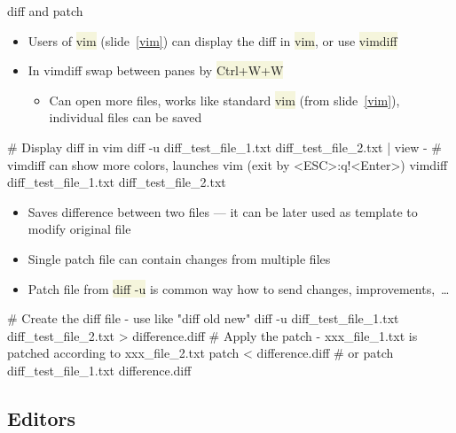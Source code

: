 \documentclass[compress, xelatex, 11pt, xcolor=svgnames, aspectratio=169, url={hyphens, lowtilde}]{beamer}
\renewcommand{\texttt}[1]{\colorbox{Beige}{{\ttfamily #1}}}
\begin{document}
\begin{frame}[fragile]{diff and patch}
	\begin{itemize}
		\item Users of \texttt{vim} (slide~\ref{vim}) can display the diff in \texttt{vim}, or use \texttt{vimdiff}
		\item In vimdiff swap between panes by \texttt{Ctrl+W+W}
		\begin{itemize}
			\item Can open more files, works like standard \texttt{vim} (from slide~\ref{vim}), individual files can be saved
		\end{itemize}
	\end{itemize}
	\vfill
	\begin{bashcode}
    # Display diff in vim
    diff -u diff_test_file_1.txt diff_test_file_2.txt | view -
    # vimdiff can show more colors, launches vim (exit by <ESC>:q!<Enter>)
    vimdiff diff_test_file_1.txt diff_test_file_2.txt
	\end{bashcode}
	\vfill
	\begin{itemize}
		\item Saves difference between two files --- it can be later used as template to modify original file
		\item Single patch file can contain changes from multiple files
		\item Patch file from \texttt{diff -u} is common way how to send changes, improvements,~\ldots
	\end{itemize}
	\vfill
	\begin{bashcode}
    # Create the diff file - use like "diff old new"
    diff -u diff_test_file_1.txt diff_test_file_2.txt > difference.diff
    # Apply the patch - xxx_file_1.txt is patched according to xxx_file_2.txt
    patch < difference.diff # or
    patch diff_test_file_1.txt difference.diff
	\end{bashcode}
\end{frame}

\subsection{Editors}
\end{document}
